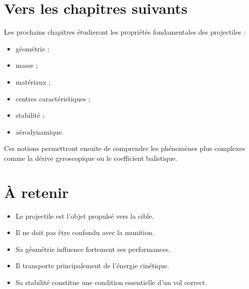 \section{Vers les chapitres suivants}

Les prochains chapitres étudieront les propriétés fondamentales des
projectiles :

\begin{itemize}
    \item géométrie ;
    \item masse ;
    \item matériaux ;
    \item centres caractéristiques ;
    \item stabilité ;
    \item aérodynamique.
\end{itemize}

Ces notions permettront ensuite de comprendre les phénomènes plus complexes
comme la dérive gyroscopique ou le coefficient balistique.

\section{À retenir}

\begin{aretenir}

\begin{itemize}
    \item Le projectile est l'objet propulsé vers la cible.
    \item Il ne doit pas être confondu avec la munition.
    \item Sa géométrie influence fortement ses performances.
    \item Il transporte principalement de l'énergie cinétique.
    \item Sa stabilité constitue une condition essentielle d'un vol correct.
\end{itemize}

\end{aretenir}
